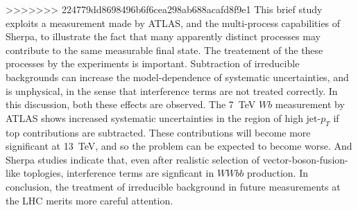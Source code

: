 \documentclass[11pt]{cernrep}
\begin{document}
>>>>>>> 224779dd8698496b6f6cea298ab688acafd8f9e1
This brief study exploits a measurement made by ATLAS, and the multi-process capabilities of Sherpa,
to illustrate the fact that many apparently distinct processes may contribute to the same measurable
final state. The treatement of the these processes by the experiments is important. Subtraction of
irreducible backgrounds can increase the model-dependence of systematic uncertainties, and is
unphysical, in the sense that interference terms are not treated correctly. In this discussion,
both these effects are observed.  The 7~TeV $Wb$ measurement by ATLAS shows increased systematic
uncertainties in the region of high jet-$p_T$ if top contributions are subtracted.  These
contributions will become more significant at 13~TeV, and so the problem can be expected to become
worse. And Sherpa studies indicate that, even after realistic selection of vector-boson-fusion-like
toplogies, interference terms are signficant in $WWbb$ production.  In conclusion, the treatment of
irreducible background in future measurements at the LHC merits more careful attention.


\end{document}
